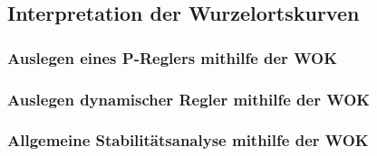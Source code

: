 \subsection{Interpretation der Wurzelortskurven}

\subsubsection{Auslegen eines P-Reglers mithilfe der WOK}

\subsubsection{Auslegen dynamischer Regler mithilfe der WOK}

\subsubsection{Allgemeine Stabilitätsanalyse mithilfe der WOK}

